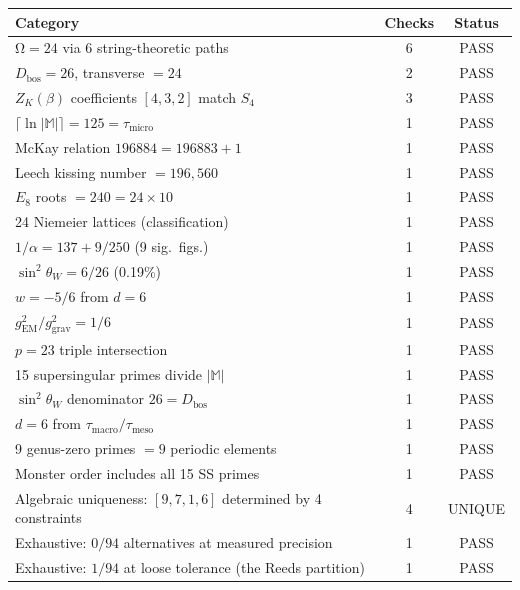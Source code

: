 \documentclass[12pt,a4paper]{article}
\theoremstyle{definition}\newtheorem{definition}[theorem]{Definition}
\theoremstyle{remark}\newtheorem{remark}[theorem]{Remark}
\renewcommand{\O}{\mathrm{\Omega}}
\newcommand{\Monster}{\mathbb{M}}
\begin{document}
\begin{center}
\small
\begin{tabular}{lcc}
\toprule
\textbf{Category} & \textbf{Checks} & \textbf{Status} \\
\midrule
$\O = 24$ via 6 string-theoretic paths & 6 & \textcolor{proved}{PASS} \\
$D_{\mathrm{bos}} = 26$, transverse $= 24$ & 2 & \textcolor{proved}{PASS} \\
$Z_K(\beta)$ coefficients $[4,3,2]$ match $S_4$ & 3 & \textcolor{proved}{PASS} \\
$\lceil\ln|\Monster|\rceil = 125 = \tau_{\mathrm{micro}}$ & 1 & \textcolor{proved}{PASS} \\
McKay relation $196884 = 196883 + 1$ & 1 & \textcolor{proved}{PASS} \\
Leech kissing number $= 196{,}560$ & 1 & \textcolor{proved}{PASS} \\
$E_8$ roots $= 240 = 24 \times 10$ & 1 & \textcolor{proved}{PASS} \\
24 Niemeier lattices (classification) & 1 & \textcolor{proved}{PASS} \\
$1/\alpha = 137 + 9/250$ (9 sig.\ figs.) & 1 & \textcolor{proved}{PASS} \\
$\sin^2\theta_W = 6/26$ (0.19\%) & 1 & \textcolor{proved}{PASS} \\
$w = -5/6$ from $d = 6$ & 1 & \textcolor{proved}{PASS} \\
$g_{\mathrm{EM}}^2/g_{\mathrm{grav}}^2 = 1/6$ & 1 & \textcolor{proved}{PASS} \\
$p = 23$ triple intersection & 1 & \textcolor{proved}{PASS} \\
15 supersingular primes divide $|\Monster|$ & 1 & \textcolor{proved}{PASS} \\
$\sin^2\theta_W$ denominator $26 = D_{\mathrm{bos}}$ & 1 & \textcolor{proved}{PASS} \\
$d = 6$ from $\tau_{\mathrm{macro}}/\tau_{\mathrm{meso}}$ & 1 & \textcolor{proved}{PASS} \\
9 genus-zero primes $= 9$ periodic elements & 1 & \textcolor{proved}{PASS} \\
Monster order includes all 15 SS primes & 1 & \textcolor{proved}{PASS} \\
\midrule
Algebraic uniqueness: $[9,7,1,6]$ determined by 4 constraints & 4 & \textcolor{proved}{UNIQUE} \\
Exhaustive: $0/94$ alternatives at measured precision & 1 & \textcolor{proved}{PASS} \\
Exhaustive: $1/94$ at loose tolerance (the Reeds partition) & 1 & \textcolor{proved}{PASS} \\

\end{tabular}
\end{center}
\end{document}
